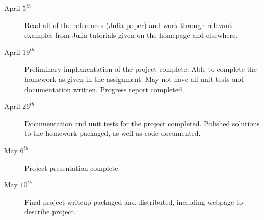\documentclass[10pt]{article}
\begin{document}
\begin{description}
\item[April $5^{th}$] Read all of the references (Julia paper) and work
  through relevant examples from Julia tutorials given on the homepage
  and elsewhere.

\item[April $19^{th}$] Preliminary implementation of the project
  complete.  Able to complete the homework as given in the assignment.
  May not have all unit tests and documentation written.  Progress
  report completed.

\item[April $26^{th}$] Documentation and unit tests for the project
  completed.  Polished solutions to the homework packaged, as well as
  code documented.

\item[May $6^{th}$] Project presentation complete.

\item[May $10^{th}$] Final project writeup packaged and distributed,
  including webpage to describe project.

\end{description}
\end{document}
